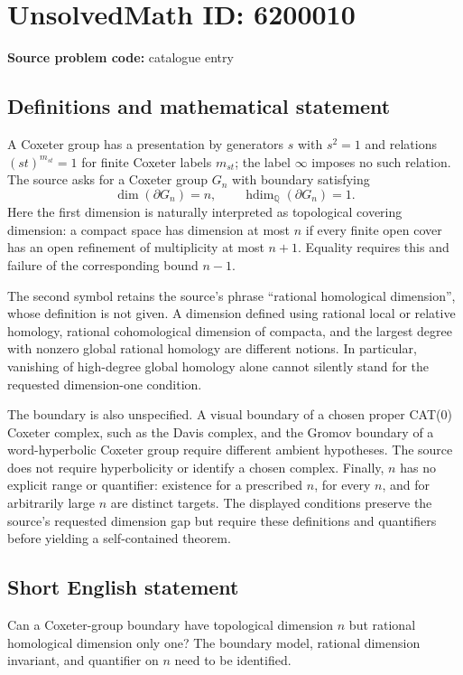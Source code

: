 \documentclass[11pt]{article}
\newcommand{\Q}{\mathbb{Q}}
\begin{document}
\section*{UnsolvedMath ID: 6200010}
\textbf{Source problem code:} catalogue entry
\subsection{Definitions and mathematical statement}
A Coxeter group has a presentation by generators $s$ with $s^2=1$ and relations $(st)^{m_{st}}=1$ for finite Coxeter labels $m_{st}$; the label $\infty$ imposes no such relation. The source asks for a Coxeter group $G_n$ with boundary satisfying
\[
\dim(\partial G_n)=n,\qquad
\operatorname{hdim}_{\Q}(\partial G_n)=1.
\]
Here the first dimension is naturally interpreted as topological covering dimension: a compact space has dimension at most $n$ if every finite open cover has an open refinement of multiplicity at most $n+1$. Equality requires this and failure of the corresponding bound $n-1$.

The second symbol retains the source's phrase ``rational homological dimension'', whose definition is not given. A dimension defined using rational local or relative homology, rational cohomological dimension of compacta, and the largest degree with nonzero global rational homology are different notions. In particular, vanishing of high-degree global homology alone cannot silently stand for the requested dimension-one condition.

The boundary is also unspecified. A visual boundary of a chosen proper CAT(0) Coxeter complex, such as the Davis complex, and the Gromov boundary of a word-hyperbolic Coxeter group require different ambient hypotheses. The source does not require hyperbolicity or identify a chosen complex. Finally, $n$ has no explicit range or quantifier: existence for a prescribed $n$, for every $n$, and for arbitrarily large $n$ are distinct targets. The displayed conditions preserve the source's requested dimension gap but require these definitions and quantifiers before yielding a self-contained theorem.
\subsection{Short English statement}
Can a Coxeter-group boundary have topological dimension $n$ but rational homological dimension only one? The boundary model, rational dimension invariant, and quantifier on $n$ need to be identified.
\end{document}
